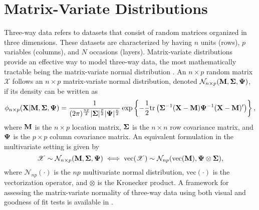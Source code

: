 \documentclass[12pt]{report}
\begin{document}
\section{Matrix-Variate Distributions}
Three-way data refers to datasets that consist of random matrices organized in three dimensions. These datasets are characterized by having $n$ units (rows), $p$ variables (columns), and $N$ occasions (layers). Matrix-variate distributions provide an effective way to model three-way data, the most mathematically tractable being the matrix-variate normal distribution \citep{gupta1999}. An $n \times p$ random matrix $\mathscr{X}$ follows an $n \times p$ matrix-variate normal distribution, denoted $\mathcal{N}_{n\times p}({\bf M, \Sigma, \Psi})$, if its density can be written as
\begin{equation*}
\phi_{n\times p}({\bf X |  M, \Sigma, \Psi}) =  \frac{1}{(2\pi)^{\frac{np}{2}}|{\bf \Sigma}|^{\frac{p}{2}}|{\bf \Psi}|^{\frac{n}{2}}} \exp\left\{ -\frac{1}{2}\text{tr}\left({\bf \Sigma}^{-1}({\bf X} - {\bf M}) {\bf \Psi}^{-1}({\bf X} - {\bf M}) '\right)\right\},
\end{equation*}
where $\bf M$ is the $n \times p$ location matrix, $\bf \Sigma$ is the $n \times n$ row covariance matrix, and $\bf \Psi$ is the $p \times p$ column covariance matrix. An equivalent formulation in the multivariate setting is given by
\begin{equation*}
\mathscr{X} \sim \mathcal{N}_{n\times p}({\bf M, \Sigma, \Psi}) \iff \text{vec}(\mathscr{X}) \sim \mathcal{N}_{np}(\text{vec}({\bf M}), {\bf \Psi} \otimes {\bf \Sigma}),
\end{equation*}
where $\mathcal{N}_{np}(\cdot)$ is the $np$ multivariate normal distribution, $\text{vec}(\cdot)$ is the vectorization operator, and $\otimes$ is the Kronecker product. A framework for assessing the matrix-variate normality of three-way data using both visual and goodness of fit tests is available in \citet{pocuca2019}. 




\end{document}
